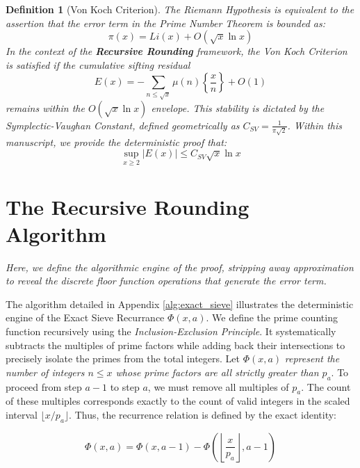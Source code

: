 \documentclass[sn-mathphys-num, pdflatex, referee]{sn-jnl}
\newtheorem{definition}[theorem]{Definition}
\begin{document}
\begin{definition}[Von Koch Criterion]
The Riemann Hypothesis is equivalent to the assertion that the error term in the Prime Number Theorem is bounded as: 
\begin{equation}
    \pi(x) = Li(x) + O(\sqrt{x} \ln x)
\end{equation}
In the context of the \textbf{Recursive Rounding} framework, the Von Koch Criterion is satisfied if the cumulative sifting residual 
\begin{equation}
    E(x) = - \sum_{n \le \sqrt{x}} \mu(n) \left\{ \frac{x}{n} \right\} + O(1)
\end{equation}
remains within the $O(\sqrt{x} \ln x)$ envelope. This stability is dictated by the \textit{Symplectic-Vaughan Constant}, defined geometrically as $C_{SV} = \frac{1}{\pi\sqrt{2}}$. Within this manuscript, we provide the deterministic proof that:
\begin{equation}
    \sup_{x \ge 2} |E(x)| \le C_{SV} \sqrt{x} \ln x
\end{equation}
\end{definition}
\section{The Recursive Rounding Algorithm}
\label{sec:algorithm}

\textit{Here, we define the algorithmic engine of the proof, stripping away approximation to reveal the discrete floor function operations that generate the error term.}

The algorithm detailed in Appendix \ref{alg:exact_sieve} illustrates the deterministic engine of the Exact Sieve Recurrance $\Phi(x,a)$. We define the prime counting function recursively using the \textit{Inclusion-Exclusion Principle}. It systematically subtracts the multiples of prime factors while adding back their intersections to precisely isolate the primes from the total integers. Let $\Phi(x, a)$ \textit{\label{ESD} represent the number of integers $n \le x$ whose prime factors are all strictly greater than $p_a$}. To proceed from step $a-1$ to step $a$, we must remove all multiples of $p_a$. The count of these multiples corresponds exactly to the count of valid integers in the scaled interval $\lfloor x/p_a \rfloor$. Thus, the recurrence relation is defined by the exact identity:

\begin{equation}
\Phi(x,a) = \Phi(x,a-1) - \Phi\left(\left\lfloor \frac{x}{p_{a}} \right\rfloor, a-1\right)
\label{eq:exact_sieve}
\end{equation}
\end{document}
